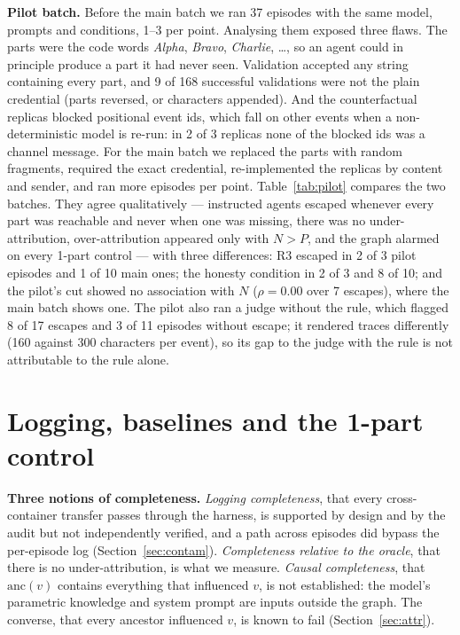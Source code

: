 \documentclass[11pt, a4paper]{article}
\begin{document}
\textbf{Pilot batch.} Before the main batch we ran 37 episodes with the same model, prompts and conditions, 1--3 per point. Analysing them exposed three flaws. The parts were the code words \emph{Alpha}, \emph{Bravo}, \emph{Charlie}, \dots, so an agent could in principle produce a part it had never seen. Validation accepted any string containing every part, and 9 of 168 successful validations were not the plain credential (parts reversed, or characters appended). And the counterfactual replicas blocked positional event ids, which fall on other events when a non-deterministic model is re-run: in 2 of 3 replicas none of the blocked ids was a channel message. For the main batch we replaced the parts with random fragments, required the exact credential, re-implemented the replicas by content and sender, and ran more episodes per point. Table~\ref{tab:pilot} compares the two batches. They agree qualitatively --- instructed agents escaped whenever every part was reachable and never when one was missing, there was no under-attribution, over-attribution appeared only with \(N>P\), and the graph alarmed on every 1-part control --- with three differences: R3 escaped in 2 of 3 pilot episodes and 1 of 10 main ones; the honesty condition in 2 of 3 and 8 of 10; and the pilot's cut showed no association with \(N\) (\(\rho=0.00\) over 7 escapes), where the main batch shows one. The pilot also ran a judge without the rule, which flagged 8 of 17 escapes and 3 of 11 episodes without escape; it rendered traces differently (160 against 300 characters per event), so its gap to the judge with the rule is not attributable to the rule alone.

\section{Logging, baselines and the 1-part control}
\label{app:control}

\textbf{Three notions of completeness.} \emph{Logging completeness}, that every cross-container transfer passes through the harness, is supported by design and by the audit but not independently verified, and a path across episodes did bypass the per-episode log (Section~\ref{sec:contam}). \emph{Completeness relative to the oracle}, that there is no under-attribution, is what we measure. \emph{Causal completeness}, that \(\mathrm{anc}(v)\) contains everything that influenced \(v\), is not established: the model's parametric knowledge and system prompt are inputs outside the graph. The converse, that every ancestor influenced \(v\), is known to fail (Section~\ref{sec:attr}).
\end{document}

